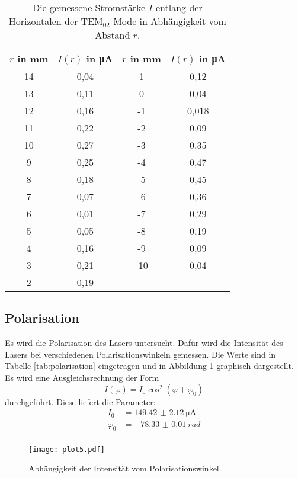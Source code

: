 \begin{table}
 \centering
 \caption{Die gemessene Stromstärke $I$ entlang der Horizontalen der $\text{TEM}_{\text{02}}$-Mode in Abhängigkeit vom Abstand $r$.}
 \label{tab:T02}
 \begin{tabular}{c c c c}
   \toprule
   $r$ in mm & $I(r)$ in \si{\micro\ampere} & $r$ in mm & $I(r)$ in \si{\micro\ampere} \\
   \midrule
   14  & 0,04 & 1   & 0,12 \\
   13  & 0,11 & 0   & 0,04 \\
   12  & 0,16 & -1  & 0,018 \\
   11  & 0,22 & -2  & 0,09 \\
   10  & 0,27 & -3  & 0,35 \\
   9   & 0,25 & -4  & 0,47 \\
   8   & 0,18 & -5  & 0,45 \\
   7   & 0,07 & -6  & 0,36 \\
   6   & 0,01 & -7  & 0,29 \\
   5   & 0,05 & -8  & 0,19 \\
   4   & 0,16 & -9  & 0,09 \\
   3   & 0,21 & -10 & 0,04 \\
   2   & 0,19 & & \\
   \bottomrule
 \end{tabular}
\end{table}

\subsection{Polarisation}
\label{sec:pol}

Es wird die Polarisation des Lasers untersucht.
Dafür wird die Intensität des Lasers bei verschiedenen Polarisationswinkeln gemessen.
Die Werte sind in Tabelle \ref{tab:polarisation} eingetragen und in Abbildung \ref{fig:polarisation} graphisch dargestellt.
Es wird eine Ausgleichsrechnung der Form
\begin{equation}
  I(\varphi) = I_0 \cos^2\left(\varphi+\varphi_0\right)
\end{equation}
durchgeführt.
Diese liefert die Parameter:
\begin{align*}
I_0 &= \SI{149.42(212)}{\micro\ampere}\\
\varphi_0 &= \SI{-78.33(1)}{rad}\\
\end{align*}

\begin{figure}
  \centering
  \texttt{[image: plot5.pdf]}
  \caption{Abhängigkeit der Intensität vom Polarisationswinkel.}
  \label{fig:polarisation}
\end{figure}

